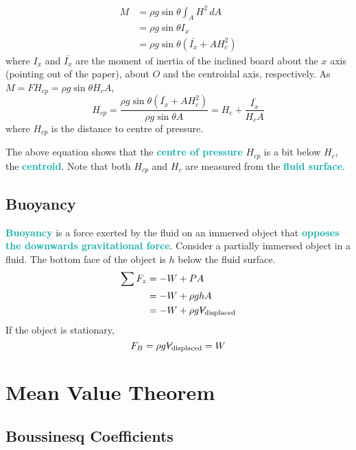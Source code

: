 \documentclass[twoside]{article}
\makeatletter
\DeclareRobustCommand{\vol}{\text{\volumedash}V}
\newcommand{\volumedash}{%
	\makebox[0pt][l]{%
		\ooalign{\hfil\hphantom{$\m@th V$}\hfil\cr\kern0.16em\rotatebox{27.5}{\textbf{--}}\hfil\cr}%
	}%
}
\newcommand{\highlightbluetext}[1]{\textcolor[HTML]{09ACA6}{\textbf{#1}}}
\numberwithin{equation}{section}
\makeatother
\begin{document}
{\begin{minipage}[c]{\textwidth-6cm}
\begin{align*}
				M &= \rho g \sin \theta \int_A H^2 \, dA \\
				  &= \rho g \sin \theta I_x \\
				  &= \rho g \sin \theta (\bar{I_x}+AH_c^2)
			\end{align*}
			where $I_x$ and $\bar{I_x}$ are the moment of inertia of the inclined board about the $x$ axis (pointing out of the paper), about $O$ and the centroidal axis, respectively. As $M = FH_{cp} = \rho g \sin \theta H_c A$,
			\begin{equation}
				H_{cp} = \frac{\rho g \sin \theta(\bar{I_x}+AH_c^2)}{\rho g \sin \theta A} = H_c+\frac{\bar{I_x}}{H_c A}
				\label{eq:DistanceToCentreOfPressure}
			\end{equation}
			where $H_{cp}$ is the distance to centre of pressure.
		\end{minipage}
	}
	
	The above equation shows that the \highlightbluetext{centre of pressure} $H_{cp}$ is a bit below $H_c$, the \highlightbluetext{centroid}. Note that both $H_{cp}$ and $H_c$ are measured from the \highlightbluetext{fluid surface}.
	
	\subsection{Buoyancy}
	\label{subsec:Buoyancy}
	
	\highlightbluetext{Buoyancy} is a force exerted by the fluid on an immersed object that \highlightbluetext{opposes the downwards gravitational force}. Consider a partially immersed object in a fluid. The bottom face of the object is $h$ below the fluid surface.
	\begin{align*}
		\sum F_z &= -W+PA \\
		&= -W+\rho ghA \\
		&= -W+\rho g \vol_{\text{displaced}}
	\end{align*}
	If the object is stationary,
	\begin{equation}
		F_B = \rho g \vol_{\text{displaced}} = W
		\label{eq:BuoyancyForce}
	\end{equation}
	
	\newpage
	
	\section{Mean Value Theorem}
	\label{sec:MeanValueTheorem}
	
	\subsection{Boussinesq Coefficients}
	\label{subsec:BoussinesqCoefficients}
	
\end{document}
